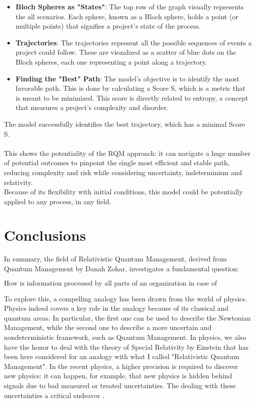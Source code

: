 \documentclass{article}
\begin{document}
\begin{itemize}
\item \textbf{Bloch Spheres as "States"}: The top row of the graph visually represents the all scenarios. Each sphere, known as a Bloch sphere, holds a point (or multiple points) that signifies a project's state of the process.
\item \textbf{Trajectories}: The trajectories represent all the possible sequences of events a project could follow. These are visualized as a scatter of blue dots on the Bloch spheres, each one representing a point along a trajectory.
\item \textbf{Finding the "Best" Path}: The model’s objective is to identify the most favorable path. This is done by calculating a Score S, which is a metric that is meant to be minimized. This score is directly related to entropy, a concept that measures a project's complexity and disorder.
\end{itemize}
The model successfully identifies the best trajectory, which has a minimal Score S.\\\\ This shows the potentiality of the RQM approach: it can navigate a huge number of potential outcomes to pinpoint the single most efficient and stable path, reducing complexity and risk while considering uncertainty, indeterminism and relativity.\\Because of its flexibility with initial conditions, this model could be potentially applied to any process, in any field.
\newpage
\section{Conclusions}
In summary, the field of Relativistic Quantum Management, derived from Quantum Management by Danah Zohar, investigates a fundamental question:
\begin{center}
\begin{equation}
    \text{How is information processed by all parts of an organization in case of uncertainty and indeterminism?}
\end{equation}
\end{center}
To explore this, a compelling analogy has been drawn from the world of physics.\\
Physics indeed covers a key role in the analogy because of its classical and quantum areas. In particular, the first one can be used to describe the Newtonian Management, while the second one to describe a more uncertain and nondeterministic framework, such as Quantum Management.
In physics, we also have the honor to deal with the theory of Special Relativity by Einstein that has been here considered for an analogy with what I called "Relativistic Quantum Management".  In the recent physics, a higher precision is required to discover new physics: it can happen, for example, that new physics is hidden behind signals due to bad measured or treated uncertainties. The dealing with these uncertainties a critical endeavor \cite{NNPDF:2021njg}. 
\end{document}
